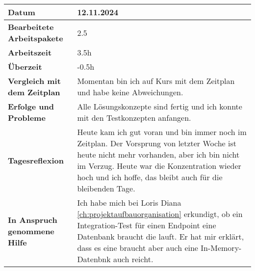 \begin{longtable}{p{}|p{}}
	\hline
	\textbf{Datum}                       & 12.11.2024            \\
	\hline
	\textbf{Bearbeitete Arbeitspakete}   & 2.5                  \\
	\hline
	\textbf{Arbeitszeit}                 & 3.5h                                    \\
	\hline
	\textbf{Überzeit}                    & -0.5h                                    \\
	\hline
	\textbf{Vergleich mit dem Zeitplan}  & Momentan bin ich auf Kurs mit dem Zeitplan und habe keine Abweichungen. \\
	\hline
	\textbf{Erfolge und Probleme} & Alle Lösungskonzepte sind fertig und ich konnte mit den Testkonzepten anfangen.
	\\
	\hline
	\textbf{Tagesreflexion} & Heute kam ich gut voran und bin immer noch im Zeitplan. Der Vorsprung von letzter Woche ist heute nicht mehr vorhanden, aber ich bin nicht im Verzug. Heute war die Konzentration wieder hoch und ich hoffe, das bleibt auch für die bleibenden Tage.
	\\
	\hline
	\textbf{In Anspruch genommene Hilfe} & Ich habe mich bei Loris Diana \ref{ch:projektaufbauorganisation} erkundigt, ob ein Integration-Test für einen Endpoint eine Datenbank braucht die lauft. Er hat mir erklärt, dass es eine braucht aber auch eine In-Memory-Datenbnk auch reicht.                              \\
	\hline
\end{longtable}\label{tab:arbeitsprotokoll-12.11.2024}
\newpage

